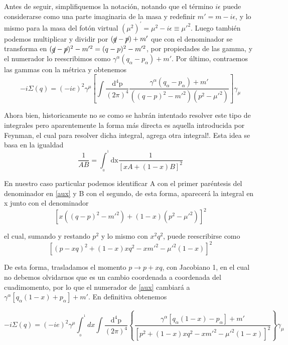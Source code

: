 \documentclass{article}
\numberwithin{equation}{section}
\begin{document}
Antes de seguir, simplifiquemos la notación, notando que el término
$i\epsilon$ puede considerarse como una parte imaginaria de la masa
y redefinir $m'=m-i\epsilon$, y lo mismo para la masa del fotón virtual $\left(\mu^{2}\right)^{'}=\mu^{2}-i\epsilon\equiv\mu'^{2}$.
Luego también podemos multiplicar y dividir por $(\cancel{q}-\cancel{p})+m'$
que con el denominador se transforma en $(\cancel{q}-\cancel{p})^{2}-m'^{2}=(q-p)^{2}-m'^{2}$,
por propiedades de las gamma, y el numerador lo reescribimos como
$\gamma^{\alpha}(q_{\alpha}-p_{\alpha})+m'$. Por último, contraemos
las gammas con la métrica y obtenemos
\begin{equation}\label{aux}
-i\Sigma(q)=(-ie)^{2}\gamma^{\mu}\left[\int\frac{\mathrm{\mathrm{d^4}p}}{(2\pi)^{4}}\frac{\gamma^{\alpha}(q_{\alpha}-p_{\alpha})+m'}{\left((q-p)^{2}-m'^{2}\right)\left(p^{2}-\mu'^{2}\right)}\right]\gamma_{\mu}
\end{equation}

Ahora bien, historicamente no se como se habrán intentado resolver
este tipo de integrales pero aparentemente la forma más directa es
aquella introducida por Feynman, el cual para resolver dicha integral,
agrega otra integral!. Esta idea se basa en la igualdad
\begin{equation}\label{integralfeynman2}
\frac{1}{AB}=\int_{_{0}}^{^{1}}\mathrm{dx}\frac{1}{\left[xA+(1-x)B\right]^{2}}
\end{equation}

En nuestro caso particular podemos identificar A con el primer paréntesis
del denominador en \ref{aux} y B con el segundo, de esta forma, aparecerá
la integral en x junto con el denominador
\begin{equation}
\left[x\left((q-p)^{2}-m'^{2}\right)+(1-x)\left(p^{2}-\mu'^{2}\right)\right]^{2}
\end{equation}

el cual, sumando y restando $ p^2 $ y lo mismo con $ x^2q^2 $, puede reescribirse como 
\begin{equation}
\left[\left(p-xq\right)^{2}+(1-x)xq^{2}-xm'^{2}-\mu'^{2}(1-x)\right]^{2}
\end{equation}

De esta forma, trasladamos el momento $p \longrightarrow p + xq$, con Jacobiano
1, en el cual no debemos olvidarnos que es un cambio coordenada a
coordenada del cuadimomento, por lo que el numerador de \ref{aux} cambiará
a $\gamma^{\alpha}\left[q_{\alpha}(1-x)+p_{\alpha}\right]+m'$.
En definitiva obtenemos

\begin{equation}\label{aux1}
-i\Sigma(q)=(-ie)^{2}\gamma^{\mu}\int_{_{0}}^{^{1}}dx\int\frac{\mathrm{\mathrm{d^4}p}}{(2\pi)^{4}}\left\{ \frac{\gamma^{\alpha}\left[q_{\alpha}(1-x)-p_{\alpha}\right]+m'}{\left[p^{2}+(1-x)xq^{2}-xm'^{2}-\mu'^{2}(1-x)\right]^{2}}\right\} \gamma_{\mu}
\end{equation}
\end{document}
